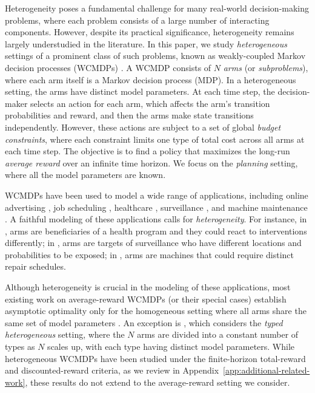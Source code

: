 \documentclass[11pt,letterpaper]{article}
\begin{document}
Heterogeneity poses a fundamental challenge for many real-world decision-making problems, where each problem consists of a large number of interacting components.
However, despite its practical significance, heterogeneity remains largely understudied in the literature.
In this paper, we study \emph{heterogeneous} settings of a prominent class of such problems, known as weakly-coupled Markov decision processes (WCMDPs) \citep{Haw_03}.
A WCMDP consists of $N$ \emph{arms} (or \emph{subproblems}), where each arm itself is a Markov decision process (MDP).
In a heterogeneous setting, the arms have distinct model parameters.
At each time step, the decision-maker selects an action for each arm, which affects the arm's transition probabilities and reward, and then the arms make state transitions independently.
However, these actions are subject to a set of global \emph{budget constraints}, where each constraint limits one type of total cost across all arms at each time step.
The objective is to find a policy that maximizes the long-run \emph{average reward} over an infinite time horizon.
We focus on the \emph{planning} setting, where all the model parameters are known.


WCMDPs have been used to model a wide range of applications, including online advertising \citep{boutilier2016budget,zhou2023rl}, job scheduling \citep{yu2018deadline}, healthcare \citep{biswas2021learning_arxiv}, surveillance \citep{villar2016indexability}, and machine maintenance  \citep{GlaMitAns_05_rb_repair}.
A faithful modeling of these applications calls for \emph{heterogeneity}.
For instance, in \citep{biswas2021learning_arxiv}, arms are beneficiaries of a health program and they could react to interventions differently; in \citep{villar2016indexability}, arms are targets of surveillance who have different locations and probabilities to be exposed; in \citep{GlaMitAns_05_rb_repair}, arms are machines that could require distinct repair schedules.  


Although heterogeneity is crucial in the modeling of these applications, most existing work on average-reward WCMDPs (or their special cases) establish asymptotic optimality only for the homogeneous setting where all arms share the same set of model parameters
\citep{WebWei_90,Ver_16_verloop,GasGauYan_23_exponential,GasGauYan_23_whittles,HonXieChe_23,HonXieChe_24,hong2024exponential,Yan_24,GolAvr_24_wcmdp_multichain}. 
An exception is \citep{Ver_16_verloop}, which considers the \emph{typed heterogeneous} setting, where the $N$ arms are divided into a constant number of types as $N$ scales up, with each type having distinct model parameters.
While heterogeneous WCMDPs have been studied under the finite-horizon total-reward and discounted-reward criteria, as we review in Appendix~\ref{app:additional-related-work}, these results do not extend to the average-reward setting we consider. 
\end{document}
